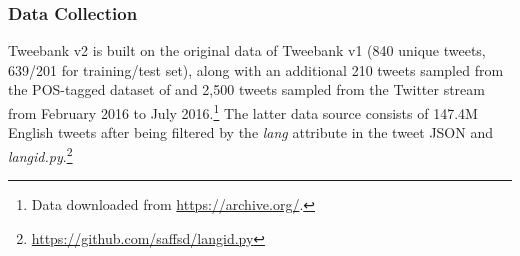 \documentclass[11pt,a4paper]{article}
\begin{document}
\subsubsection{Data Collection}
{\sc Tweebank v2} is built on the original data of {\sc Tweebank v1}
(840 unique tweets, 639/201 for training/test set), along with an 
additional 210 tweets sampled from the POS-tagged dataset of
 and 2,500 tweets sampled
from the Twitter stream from February 2016 to July 2016.\footnote{Data downloaded from \url{https://archive.org/}.}
The latter data source consists of 147.4M English tweets after being
filtered by the {\it lang} attribute in the tweet JSON and {\it
  langid.py}.\footnote{\url{https://github.com/saffsd/langid.py}} 

\end{document}
